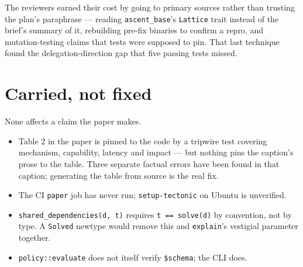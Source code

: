 \documentclass[11pt]{article}
\begin{document}
The reviewers earned their cost by going to primary sources rather than trusting
the plan's paraphrase --- reading \texttt{ascent\_base}'s \texttt{Lattice} trait
instead of the brief's summary of it, rebuilding pre-fix binaries to confirm a
repro, and mutation-testing claims that tests were supposed to pin. That last
technique found the delegation-direction gap that five passing tests missed.

\section*{Carried, not fixed}

None affects a claim the paper makes.

\begin{itemize}
  \item Table 2 in the paper is pinned to the code by a tripwire test covering
    mechanism, capability, latency and impact --- but nothing pins the caption's
    prose to the table. Three separate factual errors have been found in that
    caption; generating the table from source is the real fix.
  \item The CI \texttt{paper} job has never run; \texttt{setup-tectonic} on
    Ubuntu is unverified.
  \item \texttt{shared\_dependencies(d, t)} requires \texttt{t == solve(d)} by
    convention, not by type. A \texttt{Solved} newtype would remove this and
    \texttt{explain}'s vestigial parameter together.
  \item \texttt{policy::evaluate} does not itself verify \texttt{\$schema}; the
    CLI does.
\end{itemize}
\end{document}
